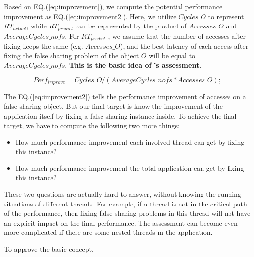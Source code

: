 Based on EQ.(\ref{eq:improvement}), we compute the potential performance improvement as EQ.(\ref{eq:improvement2}). Here, we utilize $Cycles\_O$ to represent $RT_{actual}$, while  $RT_{predict}$ can be represented by the product of $Accesses\_O$ and $AverageCycles\_{nofs}$. For $RT_{predict}$ , we assume that the number of accesses after fixing keeps the same (e.g. $Accesses\_O$), and the best latency of each access after fixing the false sharing problem of the object $O$ will be equal to $AverageCycles\_{nofs}$. {\bf This is the basic idea of \cheetah{}'s assessment}. 

\begin{equation}
\label{eq:improvement2}
 Perf_{improve}= Cycles\_O/(AverageCycles\_{nofs} * Accesses\_O);
\end{equation} 





The EQ.(\ref{eq:improvement2}) tells the performance improvement of accesses on a false sharing object. But our final target is know the improvement of the  application itself by fixing a false sharing instance inside. To achieve the final target, we have to compute the following two more things:

\begin{itemize}
\item How much performance improvement each involved thread can get by fixing this instance?

\item How much performance improvement the total application can get by fixing this instance? 

\end{itemize}

These two questions are actually hard to answer, without knowing the running situations of different threads. For example, if a thread is not in the critical path of the performance, then fixing false sharing problems in this thread will not have an explicit impact on the final performance. The assessment can become even more complicated if there are some nested threads in the application. 

To approve the basic concept, 


